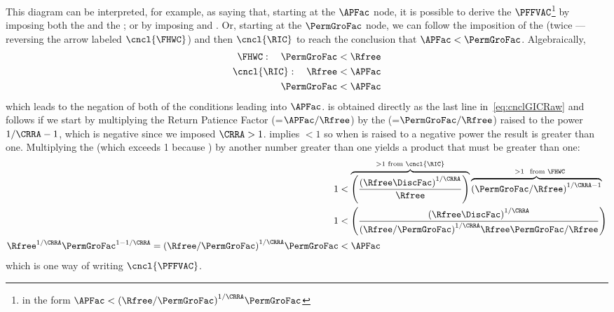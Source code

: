 \documentclass[\econtexRoot/BufferStockTheory]{subfiles}
\begin{document}
This diagram can be interpreted, for example, as saying  that, starting at the $\APFac$ node, it is possible to derive the $\PFFVAC$\footnote{in the form $\APFac < {(\Rfree/\PermGroFac)}^{1/\CRRA}\PermGroFac$} by imposing both the {\GICRaw} and the {\FHWC}; or by imposing {\RIC} and \cncl{\FHWC}.  Or, starting at the $\PermGroFac$ node, we can follow the imposition of the {\FHWC} (twice --- reversing the arrow labeled $\cncl{\FHWC}$) and then $\cncl{\RIC}$ to reach the conclusion that $\APFac < \PermGroFac$.  Algebraically,
\begin{equation}\begin{gathered}\begin{aligned}
  {\FHWC}:~~~ \PermGroFac & < \Rfree 
  \\ \cncl{\RIC}:~~~ \Rfree & < \APFac 
  \\ \PermGroFac & < \APFac \label{eq:cnclGICRaw}
\end{aligned}\end{gathered}\end{equation}
which leads to the negation of both of the conditions leading into $\APFac$.  \cncl{\GICRaw} is obtained directly as the last line in~\eqref{eq:cnclGICRaw} and \cncl{\PFFVAC} follows if we start by multiplying the Return Patience Factor ({\RPFacDefn}=$\APFac/\Rfree$) by the {\FHWF} (=$\PermGroFac/\Rfree$) raised to the power $1/\CRRA-1$, which is negative since we imposed $\CRRA > 1$.  {\FHWC} implies {\FHWF} $< 1$ so when {\FHWF} is raised to a negative power the result is greater than one.
Multiplying the {\RPFacDefn} (which exceeds 1 because \cncl{\RIC}) by another number greater than one yields a product that must be greater than one:
\begin{equation}\begin{gathered}\begin{aligned}
  1  & < \overbrace{\left(\frac{{(\Rfree \DiscFac)}^{1/\CRRA}}{\Rfree}\right)}^{>1 \text{~from~}\cncl{\RIC}}\overbrace{{\left(\PermGroFac/\Rfree\right)}^{1/\CRRA-1}}^{\phantom{\ldots}>1~\text{~from~} \FHWC} \notag
  \\ 1  & < \left(\frac{{(\Rfree \DiscFac)}^{1/\CRRA}}{{(\Rfree/\PermGroFac)}^{1/\CRRA}\Rfree\PermGroFac/\Rfree}\right) \label{eq:cnclFHWFAndcnclRICImplycnclPFFVAC}
  \\ \Rfree^{1/\CRRA}\PermGroFac^{1 - 1/\CRRA} = {(\Rfree/\PermGroFac)}^{1/\CRRA} \PermGroFac  & < \APFac \notag
\end{aligned}\end{gathered}\end{equation}
which is one way of writing $\cncl{\PFFVAC}$.
\end{document}
